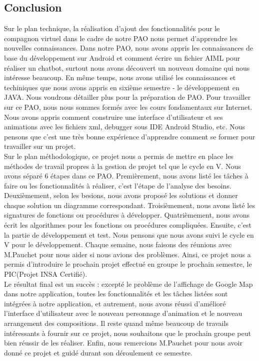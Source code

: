 \subsection{Conclusion}

\indent Sur le plan technique, la réalisation d'ajout des fonctionnalités pour le compagnon virtuel dans le cadre de notre PAO nous permet d'apprendre les nouvelles connaissances. Dans notre PAO, nous avons appris les connaissances de base du développement sur Android et  comment écrire un fichier AIML pour réaliser un chatbot, surtout nous avons découvert un nouveau domaine qui nous intéresse beaucoup. En même temps, nous avons utilisé les connaissances et techiniques que nous avons appris en sixième semestre - le développement en JAVA. Nous voudrons détailler plus pour la préparation de PAO. Pour travailler sur ce PAO, nous nous sommes formés avec les cours fondamentaux sur Internet. Nous avons appris comment construire une interface d'utilisateur et ses animations avec les fichiers xml, debugger sous IDE Android Studio, etc. Nous pensons que c'est une très bonne expérience d'apprendre comment se former pour travailler sur un projet.\\

\indent Sur le plan méthodologique, ce projet nous a permis de mettre en place les méthodes de travail propres à la gestion de projet tel que le cycle en V. Nous avons séparé 6 étapes dans ce PAO. Premièrement, nous avons listé les tâches à faire ou les fonctionnalités à réaliser, c'est l'étape de l'analyse des besoins. Deuxièmement, selon les besions, nous avons proposé les solutions et donner chaque solution un diagramme correspondant. Troisièmement, nous avons listé les signatures de fonctions ou procédures à développer. Quatrièmement, nous avons écrit les algorithmes pour les fonctions ou procédures compliquées. Ensuite, c'est la partie de développement et test. Nous pensons que nous avons suivi le cycle en V pour le développement. Chaque semaine, nous faisons des réunions avec M.Pauchet pour nous aider si nous avions des problèmes. Ainsi, ce projet nous a permis d'introduire le prochain projet effectué en groupe le prochain semestre, le PIC(Projet INSA Certifié).\\

\indent Le résultat final est un succès : excepté le problème de l'affichage de Google Map dans notre application, toutes les fonctionnalités et les tâches listées sont intégrées à notre application, et autrement, nous avons réussi d'amélioré l'interface d'utilisateur avec le nouveau personnage d'animation et  le nouveau arrangement des compositions. Il reste quand même beaucoup de travails intéressants à fournir sur ce projet, nous souhaitons que le prochain groupe peut bien réussir de les réaliser. Enfin, nous remercions M.Pauchet pour nous avoir donné ce projet et guidé durant son déroulement ce semestre.
